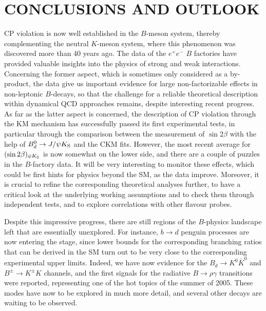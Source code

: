 \documentclass[12pt]{article}
\begin{document}
%
%
%
\section{CONCLUSIONS AND OUTLOOK}\label{sec:concl}
\setcounter{equation}{0}
%
%
%
CP violation is now well established in the $B$-meson system, thereby 
complementing the neutral $K$-meson system, where this phenomenon
was discovered more than 40 years ago. The data of the $e^+e^-$ $B$ factories 
have provided valuable insights into the physics of strong and weak interactions. Concerning the former aspect, which is sometimes only considered as 
a
by-product, the data give us important evidence for large non-factorizable 
effects in non-leptonic $B$-decays, so that the challenge for a reliable theoretical 
description within dynamical QCD approaches remains, despite interesting 
recent progress. As far as the latter aspect is concerned, the description of
CP violation through the KM mechanism has successfully passed its first
experimental tests, in particular through the comparison between the 
measurement of $\sin 2\beta$ with the help of $B^0_d\to J/\psi K_{\rm S}$ and 
the CKM fits. However, the most recent average for $(\sin2\beta)_{\psi K_{\rm S}}$ 
is now somewhat on the lower side, and there are a couple of puzzles in the
$B$-factory data. It will be very interesting to monitor these effects, which
could be first hints for physics beyond the SM, as the data improve. Moreover,
it is crucial to refine the corresponding theoretical analyses further, to have a 
critical look at the underlying working assumptions and to check them through
independent tests, and to explore correlations with other flavour probes. 

Despite this impressive progress, there are still regions of the 
$B$-physics landscape left that are essentially unexplored. 
For instance, $b\to d$ penguin processes are now entering the 
stage, since lower bounds for the corresponding branching ratios 
that can be derived in the SM turn out to be very close to
the corresponding experimental upper limits. Indeed, we have now
evidence for the $B_d\to K^0\bar K^0$ and $B^\pm\to K^\pm K$ channels,
and the first signals for the radiative $B\to\rho\gamma$ transitions
were reported, representing one of the hot topics of the summer of 2005. 
These modes have now to be explored in much more detail, and several other
decays are waiting to be observed. 
\end{document}
